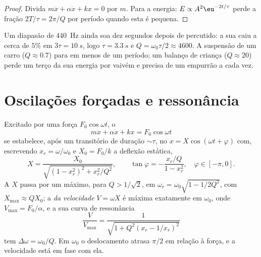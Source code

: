 \begin{proof}
Divida $m\ddot x + \alpha\dot x + kx = 0$ por $m$. Para a energia: $E
\propto A^2\eu^{-2t/\tau}$ perde a fração $2T/\tau = 2\pi/Q$ por
período quando esta é pequena.
\end{proof}

\begin{example}\label{ex:b1:oscillators-resonance:ringing}
Um diapasão de \qty{440}{Hz} ainda soa dez segundos depois de
percutido: a sua  caiu a cerca de $5\%$ em $3\tau = \qty{10}{s}$, logo
$\tau = \qty{3.3}{s}$ e $Q = \omega_0\tau/2 \approx 4600$. A suspensão de um
carro ($Q \approx 0.7$) para em menos de um período; um balanço de criança
($Q \approx 20$) perde um terço da sua energia por vaivém e precisa de um empurrão
a cada vez.
\end{example}

\section{Oscilações forçadas e ressonância}

\begin{theorem}\label{thm:b1:oscillators-resonance:forced}
Excitado por uma força $F_0\cos\omega t$, o 
\[
m\ddot x + \alpha\dot x + kx = F_0\cos\omega t
\]
se estabelece, após um transitório de duração $\sim\tau$, no  $x = X\cos(\omega t + \varphi)$ com, escrevendo $x_r = \omega/\omega_0$
e $X_0 = F_0/k$ a deflexão estática,
\[
X = \frac{X_0}{\sqrt{(1 - x_r^2)^2 + x_r^2/Q^2}}, \qquad
\tan\varphi = -\frac{x_r/Q}{1 - x_r^2}, \quad \varphi \in [-\pi, 0] .
\]
A \emph{} $X$ passa por um máximo, para $Q > 1/\sqrt2$, em $\omega_r =
\omega_0\sqrt{1 - 1/2Q^2}$, com $X_{\max} \approx QX_0$; a \emph{
da velocidade} $V = \omega X$ é máxima exatamente em $\omega_0$, onde $V_{\max} =
F_0/\alpha$, e a sua curva de ressonância
\[
\frac{V}{V_{\max}} = \frac{1}{\sqrt{1 + Q^2(x_r - 1/x_r)^2}}
\]
tem  $\Delta\omega = \omega_0/Q$. Em $\omega_0$ o deslocamento
atrasa $\pi/2$ em relação à força, e a velocidade está em fase com ela.
\end{theorem}

